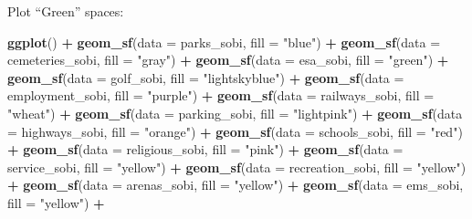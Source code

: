 \documentclass[
]{article}
\newenvironment{Shaded}{\begin{snugshade}}{\end{snugshade}}
\newcommand{\DataTypeTok}[1]{\textcolor[rgb]{0.13,0.29,0.53}{#1}}
\newcommand{\KeywordTok}[1]{\textcolor[rgb]{0.13,0.29,0.53}{\textbf{#1}}}
\newcommand{\NormalTok}[1]{#1}
\newcommand{\OperatorTok}[1]{\textcolor[rgb]{0.81,0.36,0.00}{\textbf{#1}}}
\newcommand{\StringTok}[1]{\textcolor[rgb]{0.31,0.60,0.02}{#1}}
\begin{document}
Plot ``Green'' spaces:

\begin{Shaded}
\begin{Highlighting}[]
\KeywordTok{ggplot}\NormalTok{() }\OperatorTok{+}
\StringTok{  }\KeywordTok{geom_sf}\NormalTok{(}\DataTypeTok{data =}\NormalTok{ parks_sobi,}
          \DataTypeTok{fill =} \StringTok{"blue"}\NormalTok{) }\OperatorTok{+}
\StringTok{  }\KeywordTok{geom_sf}\NormalTok{(}\DataTypeTok{data =}\NormalTok{ cemeteries_sobi,}
          \DataTypeTok{fill =} \StringTok{"gray"}\NormalTok{) }\OperatorTok{+}
\StringTok{  }\KeywordTok{geom_sf}\NormalTok{(}\DataTypeTok{data =}\NormalTok{ esa_sobi,}
          \DataTypeTok{fill =} \StringTok{"green"}\NormalTok{) }\OperatorTok{+}
\StringTok{  }\KeywordTok{geom_sf}\NormalTok{(}\DataTypeTok{data =}\NormalTok{ golf_sobi,}
          \DataTypeTok{fill =} \StringTok{"lightskyblue"}\NormalTok{) }\OperatorTok{+}
\StringTok{  }\KeywordTok{geom_sf}\NormalTok{(}\DataTypeTok{data =}\NormalTok{ employment_sobi,}
          \DataTypeTok{fill =} \StringTok{"purple"}\NormalTok{) }\OperatorTok{+}
\StringTok{  }\KeywordTok{geom_sf}\NormalTok{(}\DataTypeTok{data =}\NormalTok{ railways_sobi,}
          \DataTypeTok{fill =} \StringTok{"wheat"}\NormalTok{) }\OperatorTok{+}
\StringTok{  }\KeywordTok{geom_sf}\NormalTok{(}\DataTypeTok{data =}\NormalTok{ parking_sobi,}
          \DataTypeTok{fill =} \StringTok{"lightpink"}\NormalTok{) }\OperatorTok{+}
\StringTok{  }\KeywordTok{geom_sf}\NormalTok{(}\DataTypeTok{data =}\NormalTok{ highways_sobi,}
          \DataTypeTok{fill =} \StringTok{"orange"}\NormalTok{) }\OperatorTok{+}
\StringTok{  }\KeywordTok{geom_sf}\NormalTok{(}\DataTypeTok{data =}\NormalTok{ schools_sobi,}
          \DataTypeTok{fill =} \StringTok{"red"}\NormalTok{) }\OperatorTok{+}
\StringTok{  }\KeywordTok{geom_sf}\NormalTok{(}\DataTypeTok{data =}\NormalTok{ religious_sobi,}
          \DataTypeTok{fill =} \StringTok{"pink"}\NormalTok{) }\OperatorTok{+}
\StringTok{  }\KeywordTok{geom_sf}\NormalTok{(}\DataTypeTok{data =}\NormalTok{ service_sobi,}
          \DataTypeTok{fill =} \StringTok{"yellow"}\NormalTok{) }\OperatorTok{+}
\StringTok{  }\KeywordTok{geom_sf}\NormalTok{(}\DataTypeTok{data =}\NormalTok{ recreation_sobi,}
          \DataTypeTok{fill =} \StringTok{"yellow"}\NormalTok{) }\OperatorTok{+}
\StringTok{  }\KeywordTok{geom_sf}\NormalTok{(}\DataTypeTok{data =}\NormalTok{ arenas_sobi,}
          \DataTypeTok{fill =} \StringTok{"yellow"}\NormalTok{) }\OperatorTok{+}
\StringTok{  }\KeywordTok{geom_sf}\NormalTok{(}\DataTypeTok{data =}\NormalTok{ ems_sobi,}
          \DataTypeTok{fill =} \StringTok{"yellow"}\NormalTok{) }\OperatorTok{+}

\end{Highlighting}
\end{Shaded}
\end{document}
